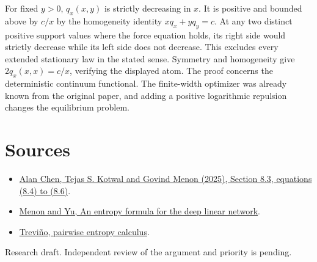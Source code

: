 \documentclass[10pt]{article}
\begin{document}
For fixed $y>0$, $q_x(x,y)$ is strictly decreasing in $x$. It is positive and bounded above by $c/x$ by the homogeneity identity $xq_x+yq_y=c$. At any two distinct positive support values where the force equation holds, its right side would strictly decrease while its left side does not decrease. This excludes every extended stationary law in the stated sense. Symmetry and homogeneity give $2q_x(x,x)=c/x$, verifying the displayed atom. The proof concerns the deterministic continuum functional. The finite-width optimizer was already known from the original paper, and adding a positive logarithmic repulsion changes the equilibrium problem.

\section*{Sources}
\begin{itemize}
\item \href{https://arxiv.org/abs/2512.06137}{Alan Chen, Tejas S. Kotwal and Govind Menon (2025), Section 8.3, equations (8.4) to (8.6)}.
\item \href{https://arxiv.org/abs/2509.09088}{Menon and Yu, An entropy formula for the deep linear network}.
\item \href{https://arxiv.org/abs/2610.05551}{Treviño, pairwise entropy calculus}.
\end{itemize}
{\small Research draft. Independent review of the argument and priority is pending.}
\end{document}
